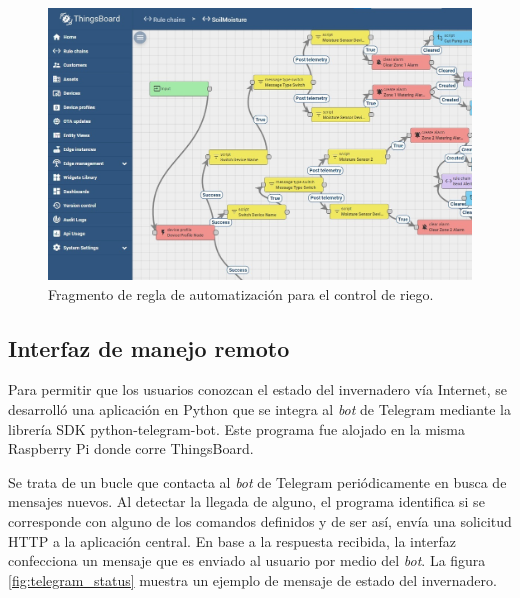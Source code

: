 \begin{figure}[!h]
	\centering
	\includegraphics[width=1\textwidth]{./Figures/chapter3/TB_Rule_Soil 2.jpg}
	\caption[Fragmento de regla de automatización para el control de riego]{Fragmento de regla de automatización para el control de riego.}
	\label{fig:rule_riego}
\end{figure}

\subsection{Interfaz de manejo remoto}
\label{sec:Interfaz de manejo remoto}



Para permitir que los usuarios conozcan el estado del invernadero vía Internet, se desarrolló una aplicación en Python que se integra al \textit{bot} de Telegram mediante la librería SDK python-telegram-bot. Este programa fue alojado en la misma Raspberry Pi donde corre ThingsBoard.


Se trata de un bucle que contacta al \textit{bot} de Telegram periódicamente en busca de mensajes nuevos. Al detectar la llegada de alguno, el programa identifica si se corresponde con alguno de los comandos definidos y de ser así, envía una solicitud HTTP a la aplicación central. En base a la respuesta recibida, la interfaz confecciona un mensaje que es enviado al usuario por medio del \textit{bot}. La figura \ref{fig:telegram_status} muestra un ejemplo de mensaje de estado del invernadero.

